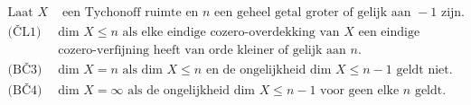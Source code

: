 \documentclass[preview]{standalone}
\begin{document}
\begin{align*}
\text{Laat }X&\text{ een Tychonoff ruimte en }n\text{ een geheel getal groter of gelijk aan }-1\text{ zijn.}
                           \\\text{(ČL1) }&\text{dim }X\leq n\text{ als elke eindige cozero-overdekking van }X\text{ een eindige}
                                        \\&\text{cozero-verfijning heeft van orde kleiner of gelijk aan }n.
                           \\\text{(BČ3) }&\text{dim }X=n\text{ als dim }X\leq n\text{ en de ongelijkheid dim }X\leq n-1\text{ geldt niet.}
                           \\\text{(BČ4) }&\text{dim }X=\infty\text{ als de ongelijkheid dim }X\leq n-1\text{ voor geen elke }n\text{ geldt.}
\end{align*}
\end{document}
